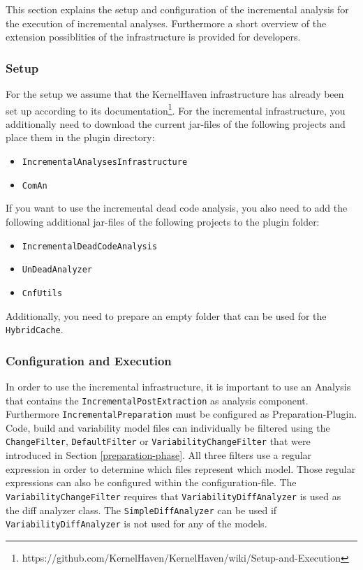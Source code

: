 \documentclass[a4paper]{article}
\begin{document}
This section explains the setup and configuration of the incremental analysis for the execution of incremental analyses. Furthermore a short overview of the extension possiblities of the infrastructure  is provided for developers.

\subsubsection{Setup}

For the setup we assume that the KernelHaven infrastructure has already been set up according to its documentation\footnote{https://github.com/KernelHaven/KernelHaven/wiki/Setup-and-Execution}.
For the incremental infrastructure, you additionally need to download the current jar-files of the following projects and place them in the plugin directory:

\begin{itemize}
	\item \texttt{IncrementalAnalysesInfrastructure} 
	\item \texttt{ComAn}
\end{itemize}

If you want to use the incremental dead code analysis, you also need to add the following additional jar-files of the following projects to the plugin folder:

\begin{itemize}
	\item \texttt{IncrementalDeadCodeAnalysis}
	\item \texttt{UnDeadAnalyzer}
	\item \texttt{CnfUtils} 
\end{itemize}

Additionally, you need to prepare an empty folder that can be used for the \texttt{HybridCache}. 

\subsubsection{Configuration and Execution}

In order to use the incremental infrastructure, it is important to use an Analysis that contains the \texttt{Incremental\-Post\-Extraction} as analysis component. Furthermore \texttt{Incremental\-Preparation} must be configured as Preparation-Plugin. Code, build and variability model files can individually be filtered using the \texttt{Change\-Filter}, \texttt{Default\-Filter} or \texttt{Variability\-Change\-Filter} that were introduced in Section \ref{preparation-phase}. All three filters use a regular expression in order to determine which files represent which model. Those regular expressions can also be configured within the configuration-file. The \texttt{Variability\-Change\-Filter} requires that \texttt{Variability\-Diff\-Analyzer} is used as the diff analyzer class. The \texttt{Simple\-Diff\-Analyzer} can be used if \texttt{Variability\-Diff\-Analyzer} is not used for any of the models.
\end{document}
